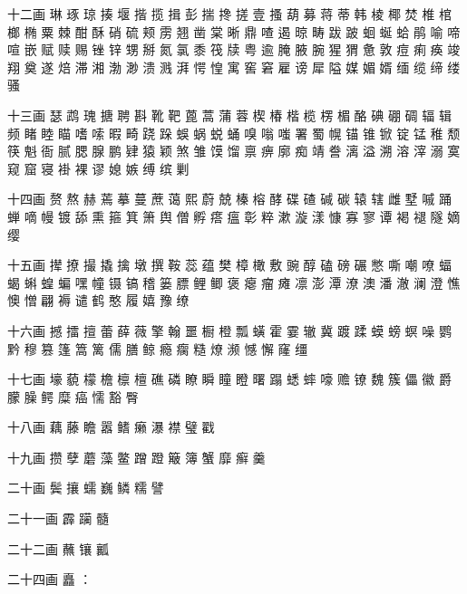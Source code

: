 {		十二画
		琳 琢 琼 揍 堰 揩 揽 揖 彭 揣 搀 搓 壹 搔 葫 募 蒋 蒂 韩 棱 椰 焚 椎
		棺 榔 椭 粟 棘 酣 酥 硝 硫
		颊 雳 翘 凿 棠 晰 鼎 喳 遏 晾 畴 跋 跛 蛔 蜒 蛤 鹃 喻 啼 喧 嵌 赋 赎
		赐 锉 锌 甥 掰 氮 氯 黍 筏
		牍 粤 逾 腌 腋 腕 猩 猬 惫 敦 痘 痢 痪 竣 翔 奠 遂 焙 滞 湘 渤 渺 溃
		溅 湃 愕 惶 寓 窖 窘 雇 谤
		犀 隘 媒 媚 婿 缅 缆 缔 缕 骚
		
		十三画
		瑟 鹉 瑰 搪 聘 斟 靴 靶 蓖 蒿 蒲 蓉 楔 椿 楷 榄 楞 楣 酪 碘 硼 碉 辐
		辑 频 睹 睦 瞄 嗜 嗦 暇 畸
		跷 跺 蜈 蜗 蜕 蛹 嗅 嗡 嗤 署 蜀 幌 锚 锥 锨 锭 锰 稚 颓 筷 魁 衙 腻
		腮 腺 鹏 肄 猿 颖 煞 雏 馍
		馏 禀 痹 廓 痴 靖 誊 漓 溢 溯 溶 滓 溺 寞 窥 窟 寝 褂 裸 谬 媳 嫉 缚
		缤 剿
		
		十四画
		赘 熬 赫 蔫 摹 蔓 蔗 蔼 熙 蔚 兢 榛 榕 酵 碟 碴 碱 碳 辕 辖 雌 墅 嘁
		踊 蝉 嘀 幔 镀 舔 熏 箍 箕
		箫 舆 僧 孵 瘩 瘟 彰 粹 漱 漩 漾 慷 寡 寥 谭 褐 褪 隧 嫡 缨
		
		十五画
		撵 撩 撮 撬 擒 墩 撰 鞍 蕊 蕴 樊 樟 橄 敷 豌 醇 磕 磅 碾 憋 嘶 嘲 嘹
		蝠 蝎 蝌 蝗 蝙 嘿 幢 镊 镐
		稽 篓 膘 鲤 鲫 褒 瘪 瘤 瘫 凛 澎 潭 潦 澳 潘 澈 澜 澄 憔 懊 憎 翩 褥
		谴 鹤 憨 履 嬉 豫 缭
		
		十六画
		撼 擂 擅 蕾 薛 薇 擎 翰 噩 橱 橙 瓢 蟥 霍 霎 辙 冀 踱 蹂 蟆 螃 螟 噪
		鹦 黔 穆 篡 篷 篙 篱 儒 膳
		鲸 瘾 瘸 糙 燎 濒 憾 懈 窿 缰
		
		十七画
		壕 藐 檬 檐 檩 檀 礁 磷 瞭 瞬 瞳 瞪 曙 蹋 蟋 蟀 嚎 赡 镣 魏 簇 儡 徽
		爵 朦 臊 鳄 糜 癌 懦 豁 臀
		
		十八画
		藕 藤 瞻 嚣 鳍 癞 瀑 襟 璧 戳
		
		十九画
		攒 孽 蘑 藻 鳖 蹭 蹬 簸 簿 蟹 靡 癣 羹
		
		二十画
		鬓 攘 蠕 巍 鳞 糯 譬
		
		二十一画
		霹 躏 髓
		
		二十二画
		蘸 镶 瓤
		
		二十四画
		矗 ：}
